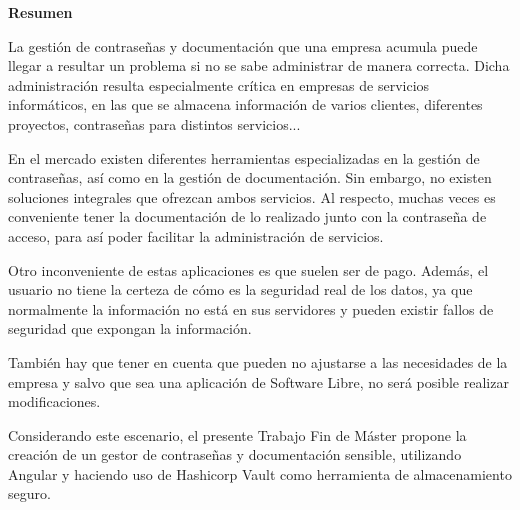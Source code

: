 \documentclass{\ClassPath/viu-tfm-template}
\begin{document}
\graphicspath{{../VIU_TFM_LaTeX_template/}}

\coverpage




\vspace*{\fill}
\begin{center}
    \textbf{Resumen}
\end{center}

La gestión de contraseñas y documentación que una empresa acumula puede llegar a resultar un problema si no se sabe administrar de manera correcta. Dicha administración resulta especialmente crítica en empresas de servicios informáticos, en las que se almacena información de varios clientes, diferentes proyectos, contraseñas para distintos servicios...

En el mercado existen diferentes herramientas  especializadas en la gestión de contraseñas, así como en la gestión de documentación. Sin embargo, no existen soluciones integrales que ofrezcan ambos servicios. Al respecto, muchas veces es conveniente tener la documentación de lo realizado junto con la contraseña de acceso, para así poder facilitar la administración de servicios.

Otro inconveniente de estas aplicaciones es que suelen ser de pago. Además, el usuario no tiene la certeza de cómo es la seguridad real de los datos, ya que normalmente la información no está en sus servidores y pueden existir fallos de seguridad que expongan la información.

También hay que tener en cuenta que pueden no ajustarse a las necesidades de la empresa y salvo que sea una aplicación de Software Libre, no será posible realizar modificaciones.

Considerando este escenario, el presente Trabajo Fin de Máster propone la creación de un gestor de contraseñas y documentación sensible, utilizando Angular y haciendo uso de Hashicorp Vault como herramienta de almacenamiento seguro.



\vspace*{\fill}
\vspace*{\fill}
\vspace*{\fill}
\end{document}
